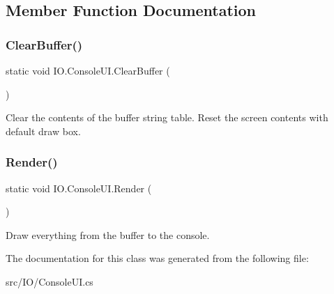 \subsection{Member Function Documentation}
\mbox{\label{class_i_o_1_1_console_u_i_a7b605726f9cc6c04e7656ffe1efa50f0}} 
\subsubsection{\texorpdfstring{Clear\+Buffer()}{ClearBuffer()}}
{\footnotesize\ttfamily static void I\+O.\+Console\+U\+I.\+Clear\+Buffer (\begin{DoxyParamCaption}{ }\end{DoxyParamCaption})\hspace{0.3cm}{\ttfamily [static]}}



Clear the contents of the buffer string table. Reset the screen contents with default draw box. 

\mbox{\label{class_i_o_1_1_console_u_i_a8fe3234db68da3a6b652446f317f92cd}} 
\subsubsection{\texorpdfstring{Render()}{Render()}}
{\footnotesize\ttfamily static void I\+O.\+Console\+U\+I.\+Render (\begin{DoxyParamCaption}{ }\end{DoxyParamCaption})\hspace{0.3cm}{\ttfamily [static]}}



Draw everything from the buffer to the console. 



The documentation for this class was generated from the following file\+:\begin{DoxyCompactItemize}
\item 
src/\+I\+O/Console\+U\+I.\+cs\end{DoxyCompactItemize}
